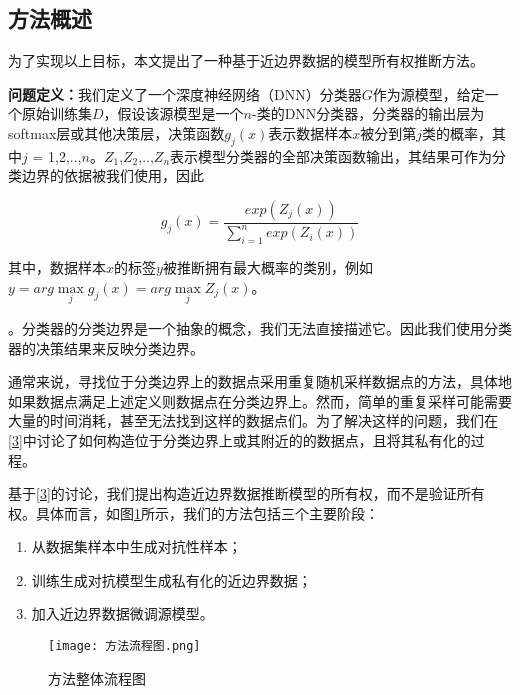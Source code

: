 \subsection{方法概述}

为了实现以上目标，本文提出了一种基于近边界数据的模型所有权推断方法。

\textbf{问题定义：}我们定义了一个深度神经网络（DNN）分类器$G$作为源模型，给定一个原始训练集$D$，假设该源模型是一个$n$-类的DNN分类器，分类器的输出层为softmax层或其他决策层，决策函数$g_j(x)$表示数据样本$x$被分到第$j$类的概率，其中$j$ = 1,2,..,$n$。$Z_1$,$Z_2$,..,$Z_n$表示模型分类器的全部决策函数输出，其结果可作为分类边界的依据被我们使用，因此

\begin{equation}
	g_j(x) = \frac{exp(Z_j(x))}{\sum_{i = 1}^n exp(Z_i(x))}
\end{equation}

\noindent 其中，数据样本$x$的标签$y$被推断拥有最大概率的类别，例如$y = arg \mathop{max} \limits_j g_j(x) = arg \mathop{max} \limits_j Z_j(x)$。

\begin{myDef}
	\label{def:2}
	。分类器的分类边界是一个抽象的概念，我们无法直接描述它。因此我们使用分类器的决策结果来反映分类边界。
\end{myDef}

通常来说，寻找位于分类边界上的数据点采用重复随机采样数据点的方法，具体地如果数据点满足上述定义则数据点在分类边界上。然而，简单的重复采样可能需要大量的时间消耗，甚至无法找到这样的数据点们。为了解决这样的问题，我们在\ref{3}中讨论了如何构造位于分类边界上或其附近的的数据点，且将其私有化的过程。

基于\ref{3}的讨论，我们提出构造近边界数据推断模型的所有权，而不是验证所有权。具体而言，如图\ref{方法流程图}所示，我们的方法包括三个主要阶段：
\begin{enumerate}
	\renewcommand{\labelenumi}{\theenumi)}
	\item 从数据集样本中生成对抗性样本；
	\item 训练生成对抗模型生成私有化的近边界数据；
	\item 加入近边界数据微调源模型。
\end{enumerate}

\begin{figure}[htbp]%
	\centering
	\texttt{[image: 方法流程图.png]}
	\setlength{\abovecaptionskip}{5mm} %
	\caption{方法整体流程图}
	\label{方法流程图}
\end {figure}

